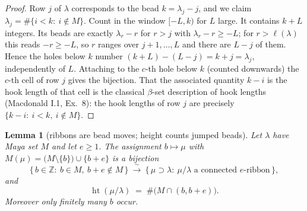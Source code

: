 \documentclass[11pt]{article}
\newtheorem{lemma}[theorem]{Lemma}
\theoremstyle{definition}
\newcommand{\hgt}{\operatorname{ht}}          %
\newcommand{\Z}{\mathbb{Z}}
\begin{document}
\begin{proof}
Row $j$ of $\lambda$ corresponds to the bead $k=\lambda_j-j$, and we claim
$\lambda_j=\#\{i<k:\ i\notin M\}$.  Count in the window $[-L,k)$ for $L$ large.  It
contains $k+L$ integers.  Its beads are exactly $\lambda_r-r$ for $r>j$ with
$\lambda_r-r\ge-L$; for $r>\ell(\lambda)$ this reads $-r\ge-L$, so $r$ ranges over
$j+1,\dots,L$ and there are $L-j$ of them.  Hence the holes below $k$ number
$(k+L)-(L-j)=k+j=\lambda_j$, independently of $L$.  Attaching to the $c$-th hole
below $k$ (counted downwards) the $c$-th cell of row $j$ gives the bijection.  That
the associated quantity $k-i$ is the hook length of that cell is the classical
$\beta$-set description of hook lengths (Macdonald I.1, Ex.~8): the hook lengths of
row $j$ are precisely $\{k-i:\ i<k,\ i\notin M\}$.
\end{proof}

\begin{lemma}[ribbons are bead moves; height counts jumped beads]\label{lem:abacus}
Let $\lambda$ have Maya set $M$ and let $e\ge1$.  The assignment
$b\mapsto \mu$ with $M(\mu)=\bigl(M\setminus\{b\}\bigr)\cup\{b+e\}$ is a bijection
\[
 \{\,b\in\Z:\ b\in M,\ b+e\notin M\,\}\ \xrightarrow{\ \sim\ }\
 \{\,\mu\supset\lambda:\ \mu/\lambda \text{ a connected }e\text{-ribbon}\,\},
\]
and
\[
  \hgt(\mu/\lambda)\;=\;\#\bigl(M\cap(b,b+e)\bigr).
\]
Moreover only finitely many $b$ occur.
\end{lemma}
\end{document}
